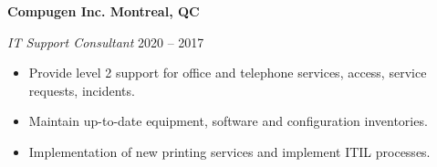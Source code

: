 \textbf{Compugen Inc. \hfill  Montreal, QC} \par
\textit{IT Support Consultant} \hfill 2020 -- 2017 \par
\begin{itemize}
	\item Provide level 2 support for office and telephone services, access, service requests, incidents.
	\item Maintain up-to-date equipment, software and configuration inventories.
    \item Implementation of new printing services and implement ITIL processes.
\end{itemize} \par